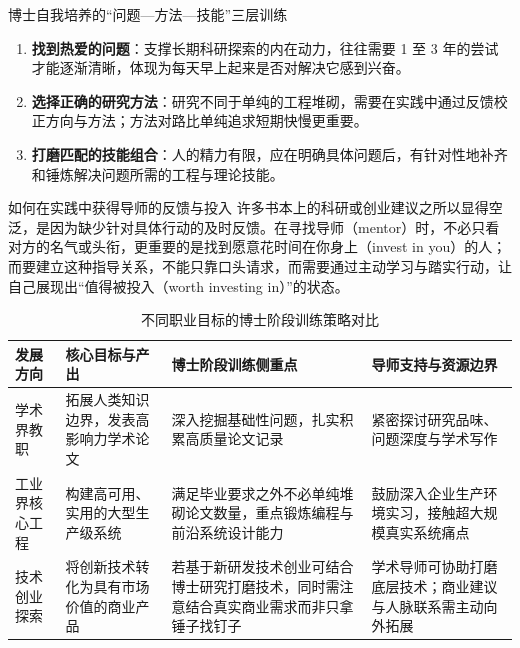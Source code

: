 \documentclass[UTF8,a4paper,11pt,fontset=fandol]{ctexart}
\begin{document}
\begin{importantbox}{博士自我培养的“问题—方法—技能”三层训练}
\begin{enumerate}
\item \textbf{找到热爱的问题}：支撑长期科研探索的内在动力，往往需要 1 至 3 年的尝试才能逐渐清晰，体现为每天早上起来是否对解决它感到兴奋。
\item \textbf{选择正确的研究方法}：研究不同于单纯的工程堆砌，需要在实践中通过反馈校正方向与方法；方法对路比单纯追求短期快慢更重要。
\item \textbf{打磨匹配的技能组合}：人的精力有限，应在明确具体问题后，有针对性地补齐和锤炼解决问题所需的工程与理论技能。
\end{enumerate}
\end{importantbox}
\begin{knowledgebox}{如何在实践中获得导师的反馈与投入}
许多书本上的科研或创业建议之所以显得空泛，是因为缺少针对具体行动的及时反馈。在寻找导师（mentor）时，不必只看对方的名气或头衔，更重要的是找到愿意花时间在你身上（invest in you）的人；而要建立这种指导关系，不能只靠口头请求，而需要通过主动学习与踏实行动，让自己展现出“值得被投入（worth investing in）”的状态。
\end{knowledgebox}
\begin{table}[H]\centering\small
\caption{不同职业目标的博士阶段训练策略对比}
\begin{tabular}{>{\raggedright\arraybackslash}p{\dimexpr(\linewidth-8\tabcolsep)/4\relax}>{\raggedright\arraybackslash}p{\dimexpr(\linewidth-8\tabcolsep)/4\relax}>{\raggedright\arraybackslash}p{\dimexpr(\linewidth-8\tabcolsep)/4\relax}>{\raggedright\arraybackslash}p{\dimexpr(\linewidth-8\tabcolsep)/4\relax}}
\toprule
发展方向 & 核心目标与产出 & 博士阶段训练侧重点 & 导师支持与资源边界\\\midrule
学术界教职 & 拓展人类知识边界，发表高影响力学术论文 & 深入挖掘基础性问题，扎实积累高质量论文记录 & 紧密探讨研究品味、问题深度与学术写作\\[4pt]
工业界核心工程 & 构建高可用、实用的大型生产级系统 & 满足毕业要求之外不必单纯堆砌论文数量，重点锻炼编程与前沿系统设计能力 & 鼓励深入企业生产环境实习，接触超大规模真实系统痛点\\[4pt]
技术创业探索 & 将创新技术转化为具有市场价值的商业产品 & 若基于新研发技术创业可结合博士研究打磨技术，同时需注意结合真实商业需求而非只拿锤子找钉子 & 学术导师可协助打磨底层技术；商业建议与人脉联系需主动向外拓展\\[4pt]
\bottomrule\end{tabular}\end{table}
\end{document}
